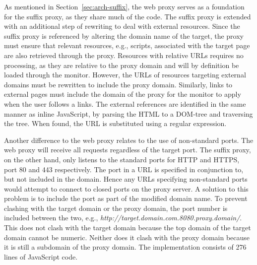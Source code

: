 \documentclass{llncs}
\begin{document}
As mentioned in Section~\ref{sec:arch-suffix}, the web proxy serves as a 
foundation for the suffix proxy, as they share much of the code. The suffix 
proxy is extended with an additional step of rewriting to deal with external resources.
Since the suffix proxy is referenced by altering the domain name of the target, 
the proxy must ensure that relevant resources, e.g., scripts, associated with the target page are also 
retrieved through the proxy. Resources with relative URLs 
requires no processing, as they are relative to the proxy domain and will by 
definition be loaded through the monitor. 
However, the URLs of resources targeting external domains must be rewritten to 
include the proxy domain. Similarly, links to external pages must include the domain of the proxy
for the %
monitor %
to apply 
when the user follows a links.
The external references are identified in the same manner as inline JavaScript, 
by parsing the HTML to a DOM-tree and traversing the tree. When found, the 
URL is substituted using a regular expression.%

Another difference to the web proxy relates to the use of non-standard ports.
The web proxy will receive all requests regardless of the target port. The 
suffix proxy, on the other hand, only listens to the standard ports for HTTP and HTTPS, port 80 and 
443 respectively. The port in a URL is specified in conjunction to, but not included in the domain.
Hence any URLs specifying non-standard ports would attempt to connect to closed 
ports on the proxy server. A solution to this problem is to include the port as part 
of the modified domain name. To prevent clashing with the target domain or the proxy domain, 
the port number is included between the two, e.g., \emph{http://target.domain.com.8080.proxy.domain/}.
This does not clash with the target domain because the top domain of the target domain cannot be numeric.
Neither does it clash with the proxy domain because it is still a subdomain of the proxy domain.
%
The implementation consists of 276 lines of JavaScript code.
\end{document}
